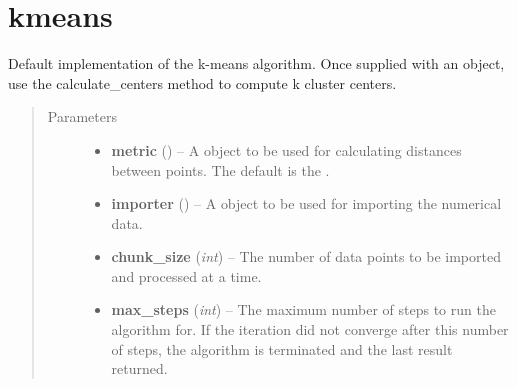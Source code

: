 \documentclass[letterpaper,10pt,english]{sphinxmanual}
\begin{document}
\section{kmeans}
\label{kmeans:module-kmeans}\label{kmeans:kmeans}

\begin{fulllineitems}
\label{kmeans:kmeans.DefaultKmeans}
Default implementation of the k-means algorithm. Once supplied with an {\hyperref[common:common_data_importer.CommonDataImporter]{}} object, use the
calculate\_centers method to compute k cluster centers.
\begin{quote}\begin{description}
\item[{Parameters}] \leavevmode\begin{itemize}
\item {} 
\textbf{metric} () -- A  object to be used for calculating distances between points. The default is
the .

\item {} 
\textbf{importer} ({\hyperref[common:common_data_importer.CommonDataImporter]{}}) -- A {\hyperref[common:common_data_importer.CommonDataImporter]{}} object to be used for importing the numerical data.

\item {} 
\textbf{chunk\_size} (\emph{int}) -- The number of data points to be imported and processed at a time.

\item {} 
\textbf{max\_steps} (\emph{int}) -- The maximum number of steps to run the algorithm for. If the iteration did not converge after
this number of steps, the algorithm is terminated and the last result returned.

\end{itemize}

\end{description}\end{quote}


\end{fulllineitems}
\end{document}
